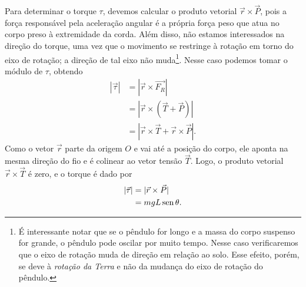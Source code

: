 \begin{marginfigure}[2cm]
\centering
{}
\caption{Decomposição da força peso em uma componente tangencial à trajetória circular e em uma componente ao longo da reta radial que liga o centro da trajetória à posição do corpo. O torque está relacionado à componente tangencial, dada por $P_t = mg\sen\theta$.}
\end{marginfigure}

Para determinar o torque $\tau$, devemos calcular o produto vetorial $\vec{r}\times\vec{P}$, pois a força responsável pela aceleração angular é a própria força peso que atua no corpo preso à extremidade da corda. Além disso, não estamos interessados na direção do torque, uma vez que o movimento se restringe à rotação em torno do eixo de rotação; a direção de tal eixo não muda\footnote{É interessante notar que se o pêndulo for longo e a massa do corpo suspenso for grande, o pêndulo pode oscilar por muito tempo. Nesse caso verificaremos que o eixo de rotação muda de direção em relação ao solo. Esse efeito, porém, se deve à \emph{rotação da Terra} e não da mudança do eixo de rotação do pêndulo.}. Nesse caso podemos tomar o módulo de $\tau$, obtendo
\begin{align}
    |\vec{\tau}| &= |\vec{r}\times\vec{F_R}| \\
    &= |\vec{r}\times(\vec{T} + \vec{P})| \\
    &= |\vec{r}\times\vec{T} + \vec{r}\times\vec{P}|.
\end{align}
%
Como o vetor $\vec{r}$ parte da origem $O$ e vai até a posição do corpo, ele aponta na mesma direção do fio e é colinear ao vetor tensão $\vec{T}$. Logo, o produto vetorial $\vec{r}\times\vec{T}$ é zero, e o torque é dado por
\begin{align}
    |\vec{\tau}| &= |\vec{r}\times\vec{P}| \\
    &= mgL\operatorname{sen}\theta.
\end{align}

